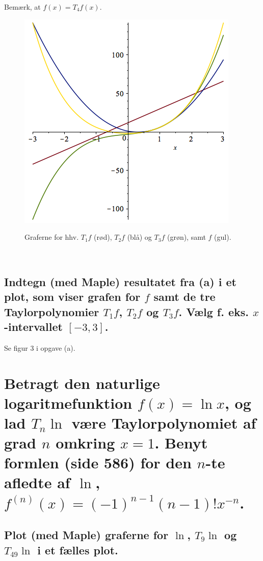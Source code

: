 \documentclass[11pt,a4paper]{article}
\begin{document}
\begin{multicols}{2}
    Bemærk, at $f(x) = T_4 f(x)$.

    \begin{figure}[H]
        \centering
        \includegraphics[scale=0.4]{figures/5-2b.png}
        \label{fig:5.2b}
        \caption{Graferne for hhv. $T_1 f$ (rød), $T_2 f$ (blå) og $T_3 f$
        (grøn), samt $f$ (gul).}
    \end{figure}

    \vfill{\ }

\end{multicols}

\subsection
{
    \mdseries
    Indtegn (med Maple) resultatet fra (a) i et plot, som viser grafen for $f$
    samt de tre Taylorpolynomier $T_1 f$, $T_2 f$ og $T_3 f$. Vælg f. eks.
    $x$-intervallet $[-3,3]$.
}
Se figur 3 i opgave (a).

\section
{
    \mdseries
    Betragt den naturlige logaritmefunktion $f(x) = \ln x$, og lad $T_n \ln$
    være Taylorpolynomiet af grad $n$ omkring $x = 1$. Benyt formlen (side
    586) for den $n$-te afledte af $\ln$, $f^{(n)}(x) = (-1)^{n - 1}
    (n - 1)!x^{-n}$.
}

\subsection
{
    \mdseries
    Plot (med Maple) graferne for $\ln$, $T_9 \ln$ og $T_{49} \ln$ i et
    fælles plot.
}
\end{document}
